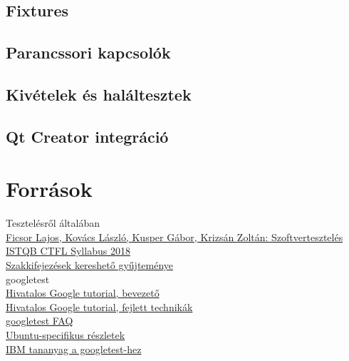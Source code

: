 \documentclass[usenames,dvipsnames,aspectratio=169]{beamer}
\newcommand{\hiv}[1]{{\color{hivatkozasszin}#1}}
\begin{document}
\subsection{Fixtures}


\subsection{Parancssori kapcsolók}


\subsection{Kivételek és haláltesztek}


\subsection{Qt Creator integráció}


\section{Források}

\begin{frame}
  Tesztelésről általában\\
  \hiv{\href{https://www.tankonyvtar.hu/hu/tartalom/tamop425/0046\_szoftverteszteles/index.html}%
  {Ficsor Lajos, Kovács László, Kusper Gábor, Krizsán Zoltán: Szoftvertesztelés}}\\
  \hiv{\href{https://hstqb.org/downloadarea/istqb-ctfl-syllabus-2018-magyar/}{ISTQB CTFL Syllabus 2018}}\\
  \hiv{\href{https://glossary.istqb.org/en/search/}{Szakkifejezések kereshető gyűjteménye}}\\
  \vfill
  googletest\\
  \hiv{\href{https://github.com/google/googletest/blob/master/googletest/docs/primer.md}%
    {Hivatalos Google tutorial, bevezető}}\\
  \hiv{\href{https://github.com/google/googletest/blob/master/googletest/docs/advanced.md}%
    {Hivatalos Google tutorial, fejlett technikák}}\\
  \hiv{\href{https://github.com/google/googletest/blob/master/googletest/docs/faq.md}{googletest FAQ}}\\
  \hiv{\href{https://www.eriksmistad.no/getting-started-with-google-test-on-ubuntu/}%
    {Ubuntu-specifikus részletek}}\\
  \hiv{\href{https://developer.ibm.com/articles/au-googletestingframework/}{IBM tananyag a googletest-hez}}\\
\end{frame}
\end{document}
